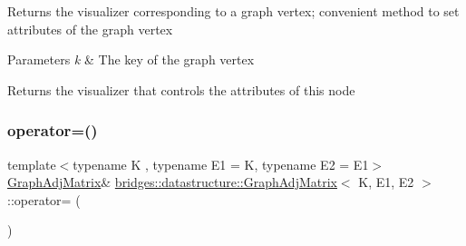 Returns the visualizer corresponding to a graph vertex; convenient method to set attributes of the graph vertex


\begin{DoxyParams}{Parameters}
{\em k} & The key of the graph vertex\\
\hline
\end{DoxyParams}
\begin{DoxyReturn}{Returns}
the visualizer that controls the attributes of this node 
\end{DoxyReturn}
\mbox{\label{classbridges_1_1datastructure_1_1_graph_adj_matrix_a6203e8d0b6feabdbd1b7ea0619dbe063}} 
\subsubsection{\texorpdfstring{operator=()}{operator=()}}
{\footnotesize\ttfamily template$<$typename K , typename E1  = K, typename E2  = E1$>$ \\
\hyperlink{classbridges_1_1datastructure_1_1_graph_adj_matrix}{Graph\+Adj\+Matrix}\& \hyperlink{classbridges_1_1datastructure_1_1_graph_adj_matrix}{bridges\+::datastructure\+::\+Graph\+Adj\+Matrix}$<$ K, E1, E2 $>$\+::operator= (\begin{DoxyParamCaption}\item[{const \hyperlink{classbridges_1_1datastructure_1_1_graph_adj_matrix}{Graph\+Adj\+Matrix}$<$ K, E1, E2 $>$ \&}]{ }\end{DoxyParamCaption})\hspace{0.3cm}{\ttfamily [delete]}}

\mbox{\label{classbridges_1_1datastructure_1_1_graph_adj_matrix_a9367d6bee5ce194bad2c8ca105d5be2f}} 
